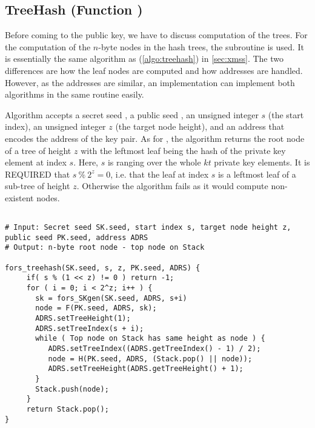 \subsection{\fors TreeHash (Function \forstreehash)}
   Before coming to the \fors public key, we have to discuss computation of the
   trees.
   For the computation of the $n$-byte nodes in the \fors hash trees,
   the subroutine \forstreehash is used. It is essentially the same algorithm
   as \treehash (\autoref{algo:treehash}) in \autoref{sec:xmss}. The two
   differences are how the leaf nodes are computed and how addresses are handled.
   However, as the addresses are similar, an implementation can implement both
   algorithms in the same routine easily.

   Algorithm \forstreehash accepts a secret seed \sseed,
   a public seed \pseed, an unsigned integer $s$ (the start index), an
   unsigned integer $z$ (the target node height), and an address \adrs that
   encodes the address of the \fors key pair. As for \treehash, the
   \forstreehash algorithm returns the root node of a tree of height $z$ with
   the leftmost leaf being the hash of the private key element at index $s$.
   Here, $s$ is ranging over the whole $kt$ private key elements.
   It is REQUIRED that $s\ \%\ 2^z = 0$, i.e. that the leaf at index $s$ is a
   leftmost leaf of a sub-tree of height $z$.  Otherwise the algorithm fails
   as it would compute non-existent nodes.

   \begin{lstlisting}[breaklines=true, label=algo:forstreehash, language=pseudoc,
                   caption=The \forstreehash algorithm.]

# Input: Secret seed SK.seed, start index s, target node height z, public seed PK.seed, address ADRS
# Output: n-byte root node - top node on Stack

fors_treehash(SK.seed, s, z, PK.seed, ADRS) {
     if( s % (1 << z) != 0 ) return -1;
     for ( i = 0; i < 2^z; i++ ) {
       sk = fors_SKgen(SK.seed, ADRS, s+i)
       node = F(PK.seed, ADRS, sk);
       ADRS.setTreeHeight(1);
       ADRS.setTreeIndex(s + i);
       while ( Top node on Stack has same height as node ) {
          ADRS.setTreeIndex((ADRS.getTreeIndex() - 1) / 2);
          node = H(PK.seed, ADRS, (Stack.pop() || node));
          ADRS.setTreeHeight(ADRS.getTreeHeight() + 1);
       }
       Stack.push(node);
     }
     return Stack.pop();
}

\end{lstlisting}

